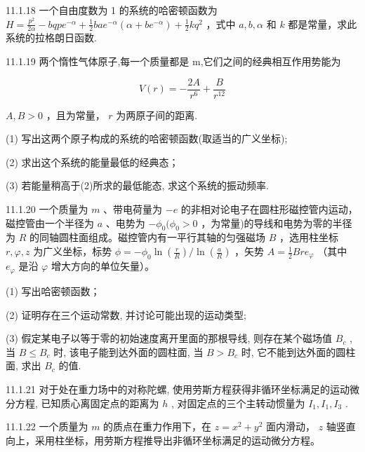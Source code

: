 \begin{problem}{11.1.18}
一个自由度数为 1 的系统的哈密顿函数为 $H = \frac{p^2}{2\alpha} - bqpe^{-\alpha} + \frac{1}{2} bae^{-\alpha} (\alpha + be^{-\alpha}) + \frac{1}{2} kq^2$ ，式中 $a, b, \alpha$ 和 $k$ 都是常量，求此系统的拉格朗日函数.
\end{problem}
\clearpage


\begin{problem}{11.1.19}
两个惰性气体原子,每一个质量都是 m,它们之间的经典相互作用势能为

\[
V (r) = - \frac {2 A}{r ^ {6}} + \frac {B}{r ^ {1 2}}
\]

$A, B > 0$ ，且为常量， $r$ 为两原子间的距离.

(1) 写出这两个原子构成的系统的哈密顿函数(取适当的广义坐标);

(2) 求出这个系统的能量最低的经典态；

(3) 若能量稍高于(2)所求的最低能态, 求这个系统的振动频率.
\end{problem}
\clearpage


\begin{problem}{11.1.20}
一个质量为 $m$ 、带电荷量为 $-e$ 的非相对论电子在圆柱形磁控管内运动，磁控管由一个半径为 $a$ 、电势为 $-\phi_0 (\phi_0 > 0$ ，为常量)的导线和电势为零的半径为 $R$ 的同轴圆柱面组成。磁控管内有一平行其轴的匀强磁场 $B$ ，选用柱坐标 $r, \varphi, z$ 为广义坐标，标势 $\phi = -\phi_0 \ln \left( \frac{r}{R} \right) / \ln \left( \frac{a}{R} \right)$ ，矢势 $A = \frac{1}{2} B r e_\varphi$ （其中 $e_\varphi$ 是沿 $\varphi$ 增大方向的单位矢量）。

(1) 写出哈密顿函数；

(2) 证明存在三个运动常数, 并讨论可能出现的运动类型;

(3) 假定某电子以等于零的初始速度离开里面的那根导线, 则存在某个磁场值 $B_{c}$ , 当 $B \leqslant B_{c}$ 时, 该电子能到达外面的圆柱面, 当 $B > B_{c}$ 时, 它不能到达外面的圆柱面, 求出 $B_{c}$ 的值.
\end{problem}
\clearpage


\begin{problem}{11.1.21}
对于处在重力场中的对称陀螺, 使用劳斯方程获得非循环坐标满足的运动微分方程, 已知质心离固定点的距离为 $h$ , 对固定点的三个主转动惯量为 $I_{1}, I_{1}, I_{3}$ .
\end{problem}
\clearpage


\begin{problem}{11.1.22}
一个质量为 $m$ 的质点在重力作用下，在 $z = x^{2} + y^{2}$ 面内滑动， $z$ 轴竖直向上，采用柱坐标，用劳斯方程推导出非循环坐标满足的运动微分方程。
\end{problem}
\clearpage


